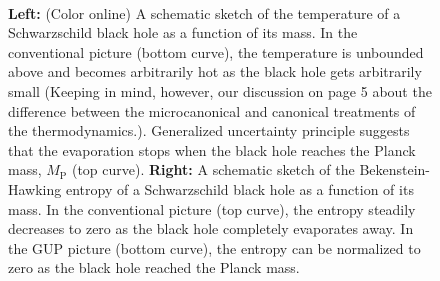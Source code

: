 \documentclass[12pt]{article}
\newcommand{\2}{$^2$}
\newcommand{\3}{$^3$}
\newcommand{\4}{$_4$}
\newcommand{\5}{$_5$}
\begin{document}
\begin{figure}[!h]
\centering
\mbox{\quad
{}}
\caption{\textbf{Left:} (Color online) A schematic sketch of the temperature of a Schwarzschild black hole as a function of its mass. In the conventional picture (bottom curve), the temperature is unbounded above and becomes arbitrarily hot as the black hole gets arbitrarily small (Keeping in mind, however, our discussion on page 5 about the difference between the microcanonical and canonical treatments of the thermodynamics.). Generalized uncertainty principle suggests that the evaporation stops when the black hole reaches the Planck mass, $M_\text{P}$ (top curve). \textbf{Right:} A schematic sketch of the Bekenstein-Hawking entropy of a Schwarzschild black hole as a function of its mass. In the conventional picture (top curve), the entropy steadily decreases to zero as the black hole completely evaporates away. In the GUP picture (bottom curve), the entropy can be normalized to zero as the black hole reached the Planck mass. \label{GUPeffect}}
\end{figure}
\end{document}
